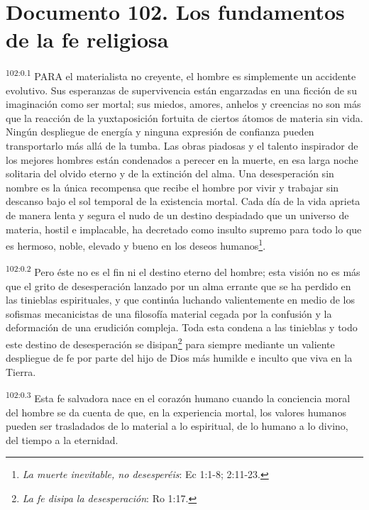 \documentclass[twoside, 11pt]{book}
\begin{document}
\chapter{Documento 102. Los fundamentos de la fe religiosa}
\par
\textsuperscript{102:0.1} PARA el materialista no creyente, el hombre es simplemente un accidente evolutivo. Sus esperanzas de supervivencia están engarzadas en una ficción de su imaginación como ser mortal; sus miedos, amores, anhelos y creencias no son más que la reacción de la yuxtaposición fortuita de ciertos átomos de materia sin vida. Ningún despliegue de energía y ninguna expresión de confianza pueden transportarlo más allá de la tumba. Las obras piadosas y el talento inspirador de los mejores hombres están condenados a perecer en la muerte, en esa larga noche solitaria del olvido eterno y de la extinción del alma. Una desesperación sin nombre es la única recompensa que recibe el hombre por vivir y trabajar sin descanso bajo el sol temporal de la existencia mortal. Cada día de la vida aprieta de manera lenta y segura el nudo de un destino despiadado que un universo de materia, hostil e implacable, ha decretado como insulto supremo para todo lo que es hermoso, noble, elevado y bueno en los deseos humanos\footnote{\textit{La muerte inevitable, no desesperéis}: Ec 1:1-8; 2:11-23.}.

\par
\textsuperscript{102:0.2} Pero éste no es el fin ni el destino eterno del hombre; esta visión no es más que el grito de desesperación lanzado por un alma errante que se ha perdido en las tinieblas espirituales, y que continúa luchando valientemente en medio de los sofismas mecanicistas de una filosofía material cegada por la confusión y la deformación de una erudición compleja. Toda esta condena a las tinieblas y todo este destino de desesperación se disipan\footnote{\textit{La fe disipa la desesperación}: Ro 1:17.} para siempre mediante un valiente despliegue de fe por parte del hijo de Dios más humilde e inculto que viva en la Tierra.

\par
\textsuperscript{102:0.3} Esta fe salvadora nace en el corazón humano cuando la conciencia moral del hombre se da cuenta de que, en la experiencia mortal, los valores humanos pueden ser trasladados de lo material a lo espiritual, de lo humano a lo divino, del tiempo a la eternidad.
\end{document}
